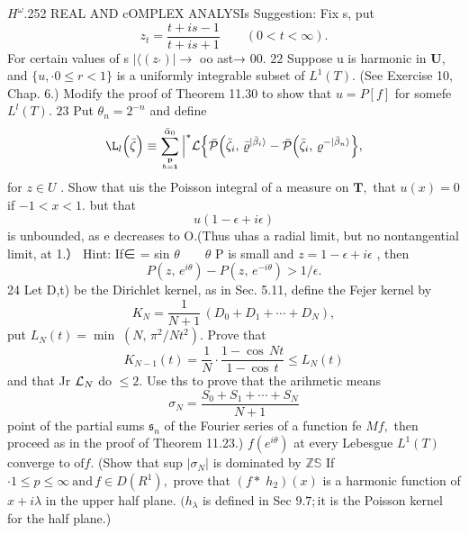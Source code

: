 $H^{\omega}.$252 REAL AND cOMPLEX ANALYSIs Suggestion: Fix s, put $$ z_{t}={\frac{t+i s-1}{t+i s+1}}\qquad(0<t<\infty). $$ For certain values of s $|\langle(z_{\prime})|\to$ oo ast→ 00. $\mathrm{22}$ Suppose u is harmonic in ${\boldsymbol{U}},$ and $\{u,\cdot0\leq r<1\}$ is a uniformly integrable subset of $L^{1}(T).$ (See Exercise 10, Chap. 6.) Modify the proof of Theorem 11.30 to show that $u=P[f]$ for somefe $L^{l}(T).$ $23$ Put $\theta_{n}=2^{-n}$ and define $$ \L_{l}\Big(\bar{\zeta}\Big)\equiv\sum_{\bf p\atop{\hbar=1}}^{\bar{\alpha}_{0}}\Big|^{*}\mathcal{L}\Big\{\bar{\cal{P}}\Big(\bar{\zeta}_{i},\,\bar{\varrho}^{ |\bar{\beta}_{i} \rangle}-\bar{\cal{P}}\Big(\bar{\zeta}_{i},\,\varrho^{- |\bar{\beta}_{n} \rangle}\Big\}, $$ for $z\in U$ . Show that uis the Poisson integral of a measure on ${\boldsymbol{T}},$ that $u(x)=0$ if $-1<x<1.$ but that $$ u(1-\epsilon+i\epsilon) $$ is unbounded, as e decreases to O.(Thus uhas a radial limit, but no nontangential limit, at 1.） Hint: If∈ = sin $\theta\qquad\theta$ P is small and $z=1-\epsilon+i\epsilon$ , then $$ P(z,\,e^{i\theta})-P(z,\,e^{-i\theta})>1/\epsilon. $$ 24 Let D,t) be the Dirichlet kernel, as in Sec. 5.11, define the Fejer kernel by $$ K_{N}=\frac{1}{N+1}\,(D_{0}+D_{1}+\cdots+D_{N}), $$ put $L_{N}(t)=\operatorname*{min}\;(N,\,\pi^{2}/N t^{2}).$ Prove that $$ K_{N-1}(t)={\frac{1}{N}}\cdot{\frac{1-\cos\,N t}{1-\cos\,t}}\leq L_{N}(t) $$ and that Jr ${\cal L}_{N}$ do $\leq2.$ Use ths to prove that the arihmetic means $$ \sigma_{N}={\frac{S_{0}+S_{1}+\cdots+S_{N}}{N+1}} $$ point of the partial sums ${\mathfrak{s}}_{n}$ of the Fourier series of a function fe $M f,$ then proceed as in the proof of Theorem 11.23.) $f(e^{i\theta})$ at every Lebesgue $L^{1}(T)$ converge to ${\mathrm{of}}f.$ (Show that sup $|\sigma_{N}|$ is dominated by $\mathbb{Z}\mathbb{S}$ If $\cdot1\le p\le\infty\ \mathrm{and}\,f\in D(R^{1}),$ prove that $(f*\;h_{2})(x)$ is a harmonic function of $x+i\lambda$ in the upper half plane. $(h_{\lambda}$ is defined in Sec $9.7;\mathrm{it}$ is the Poisson kernel for the half plane.)